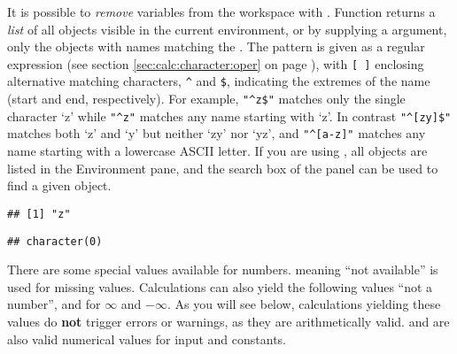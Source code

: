 \documentclass[krantz2]{krantz}\usepackage{knitr}
\begin{document}
It is possible to \emph{remove} variables from the workspace with . Function  returns a \emph{list} of all objects visible in the current environment, or by supplying a  argument, only the objects with names matching the . The pattern is given as a regular expression (see section \ref{sec:calc:character:oper} on page \pageref{sec:calc:character:oper}), with \verb|[ ]| enclosing alternative matching characters, \verb|^| and \verb|$|, indicating the extremes of the name (start and end, respectively). For example, \verb|"^z$"| matches only the single character `z' while \verb|"^z"| matches any name starting with `z'. In contrast \verb|"^[zy]$"| matches both `z' and `y' but neither `zy' nor `yz', and \verb|"^[a-z]"| matches any name starting with a lowercase ASCII letter. If you are using , all objects are listed in the Environment pane, and the search box of the panel can be used to find a given object.

\begin{knitrout}\footnotesize
{}\color{fgcolor}\begin{kframe}
\begin{alltt}
\hlstd{(}\hlstd{=}\hlstd{)}
\end{alltt}
\begin{verbatim}
## [1] "z"
\end{verbatim}
\begin{alltt}
\hlstd{(}\hlstd{=}\hlstd{)}
\end{alltt}
\begin{verbatim}
## character(0)
\end{verbatim}
\end{kframe}
\end{knitrout}

There\label{par:special:values} are some special values available for numbers.  meaning ``not available'' is used for missing values. Calculations can also yield the following values  ``not a number'',  and  for $\infty$ and $-\infty$. As you will see below, calculations yielding these values do \textbf{not} trigger errors or warnings, as they are arithmetically valid.  and  are also valid numerical values for input and constants.
\end{document}
